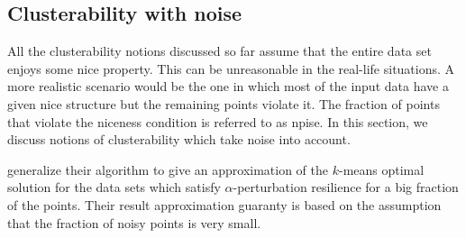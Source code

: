 \documentclass[twoside]{article}
\newcommand{\mc}{\mathcal}
\newtheorem{definition}[theorem]{Definition}
\begin{document}

\subsection{Clusterability with noise}
All the clusterability notions discussed so far assume that the entire data set enjoys some nice property. This can be unreasonable in the real-life situations. A more realistic scenario would be the one in which most of the input data have a given nice structure but the remaining points violate it. The fraction of points that violate the niceness condition is referred to as npise.
In this section, we discuss notions of clusterability which take noise into account. 



\cite{balcan2012clustering} generalize their algorithm to give an approximation of the $k$-means optimal solution for the data sets which satisfy $\alpha$-perturbation resilience for a big fraction of the points. Their result approximation guaranty is based on the assumption that the fraction of noisy points is very small.


\cite{ben2014clustering}
\end{document}
